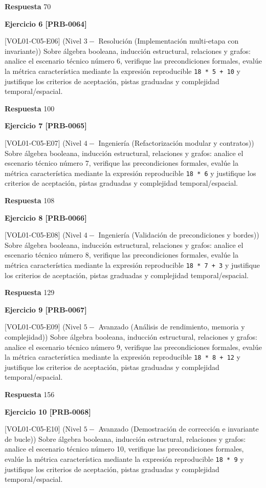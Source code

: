 \documentclass{book}
\begin{document}
\noindent\textbf{Respuesta} 70

\noindent\textbf{Ejercicio 6 [PRB-0064]}

[VOL01-C05-E06] (Nivel \(3 -\) Resolución (Implementación multi-etapa con invariante)) Sobre álgebra booleana, inducción estructural, relaciones y grafos: analice el escenario técnico número 6, verifique las precondiciones formales, evalúe la métrica característica mediante la expresión reproducible \texttt{18 * 5 + 10} y justifique los criterios de aceptación, pistas graduadas y complejidad temporal/espacial.

\noindent\textbf{Respuesta} 100

\noindent\textbf{Ejercicio 7 [PRB-0065]}

[VOL01-C05-E07] (Nivel \(4 -\) Ingeniería (Refactorización modular y contratos)) Sobre álgebra booleana, inducción estructural, relaciones y grafos: analice el escenario técnico número 7, verifique las precondiciones formales, evalúe la métrica característica mediante la expresión reproducible \texttt{18 * 6} y justifique los criterios de aceptación, pistas graduadas y complejidad temporal/espacial.

\noindent\textbf{Respuesta} 108

\noindent\textbf{Ejercicio 8 [PRB-0066]}

[VOL01-C05-E08] (Nivel \(4 -\) Ingeniería (Validación de precondiciones y bordes)) Sobre álgebra booleana, inducción estructural, relaciones y grafos: analice el escenario técnico número 8, verifique las precondiciones formales, evalúe la métrica característica mediante la expresión reproducible \texttt{18 * 7 + 3} y justifique los criterios de aceptación, pistas graduadas y complejidad temporal/espacial.

\noindent\textbf{Respuesta} 129

\noindent\textbf{Ejercicio 9 [PRB-0067]}

[VOL01-C05-E09] (Nivel \(5 -\) Avanzado (Análisis de rendimiento, memoria y complejidad)) Sobre álgebra booleana, inducción estructural, relaciones y grafos: analice el escenario técnico número 9, verifique las precondiciones formales, evalúe la métrica característica mediante la expresión reproducible \texttt{18 * 8 + 12} y justifique los criterios de aceptación, pistas graduadas y complejidad temporal/espacial.

\noindent\textbf{Respuesta} 156

\noindent\textbf{Ejercicio 10 [PRB-0068]}

[VOL01-C05-E10] (Nivel \(5 -\) Avanzado (Demostración de corrección e invariante de bucle)) Sobre álgebra booleana, inducción estructural, relaciones y grafos: analice el escenario técnico número 10, verifique las precondiciones formales, evalúe la métrica característica mediante la expresión reproducible \texttt{18 * 9} y justifique los criterios de aceptación, pistas graduadas y complejidad temporal/espacial.
\end{document}
